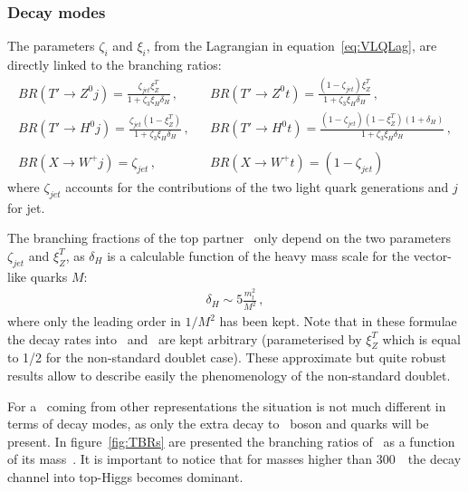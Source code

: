 \subsubsection{Decay modes}
\label{sec:decay}

The parameters $\zeta_{i}$ and $\xi_i$, from the Lagrangian in equation~\ref{eq:VLQLag}, are directly linked to the branching ratios:
 \begin{eqnarray} 
BR (T' \to Z^{0} j) = \frac{\zeta_{jet} \xi^T_Z}{1+\zeta_3 \xi_H \delta_H}\,, & & BR (T' \to Z^{0} t) = \frac{(1-\zeta_{jet}) \xi^T_Z}{1+\zeta_3 
\xi_H \delta_H}\,,\\
BR(T' \to H^{0} j) = \frac{\zeta_{jet} (1-\xi^T_Z)}{1+\zeta_3 \xi_H \delta_H}\,, & &  BR(T' \to H^{0} t) = \frac{(1-\zeta_{jet})
(1-\xi^T_Z) (1+\delta_H)}{1+\zeta_3 \xi_H \delta_H}\,, \nonumber\\
 & & \nonumber \\
BR(X \to W^{+} j) = \zeta_{jet}\,, & & BR(X \to W^{+} t) = (1-\zeta_{jet})
 \end{eqnarray} where $\zeta_{jet}$ accounts for the contributions of the two light quark generations and $j$ for jet.

The branching fractions of the top partner \Tp~only depend on the two parameters $\zeta_{jet}$ and $\xi_Z^{T}$, as $\delta_H$ is a calculable function of the heavy mass scale for the vector-like quarks $M$:
\begin{eqnarray} 
\delta_H  \sim 5 \frac{m^2_t}{M^2}\,, \label{eq:deltaH}
\end{eqnarray} 
where only the leading order in $1/M^2$ has been kept. Note that in these formulae the decay rates into \Z~and \Hb~are kept arbitrary (parameterised by $\xi_Z^{T}$ which is equal to 1/2 for the non-standard doublet case). These approximate but quite robust results allow to describe easily the phenomenology of the non-standard doublet. 

For a \Tp~coming from other representations the situation is not much different in terms of decay modes, as only the extra decay to \W~boson and quarks will be present. In figure~\ref{fig:TBRs} are presented the branching ratios of \Tp~as a function of its mass~\cite{Cacciapaglia:2011fx}. It is important to notice that for masses higher than 300~\GeVcc~the decay channel into top-Higgs becomes dominant.

